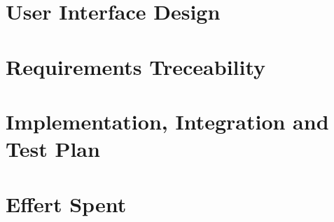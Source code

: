 \documentclass{config/PoliMi3i_thesis}
\begin{document}
\chapter{User Interface Design}


\chapter{Requirements Treceability}


\chapter{Implementation, Integration and Test Plan}


\chapter{Effert Spent}





\listoffigures
\listoftables

\cleardoublepage
\end{document}
